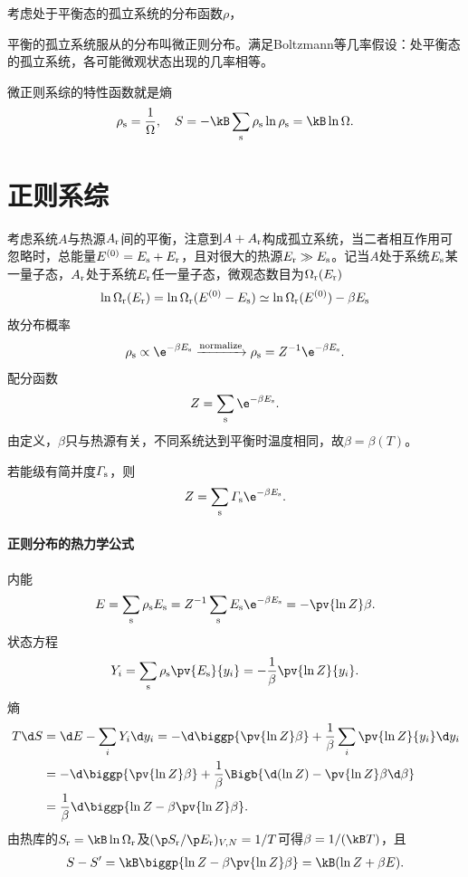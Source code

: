 考虑处于平衡态的孤立系统的分布函数$\rho$，

平衡的孤立系统服从的分布叫微正则分布。满足Boltzmann等几率假设：处平衡态的孤立系统，各可能微观状态出现的几率相等。

微正则系综的特性函数就是熵
\[
	\rho_\st=\frac1\Omega,\quad S=-\kB\sum_\st\rho_\st\ln\rho_\st=\kB\ln\Omega.
\]

\section{正则系综}

考虑系统$A$与热源$A_\mathrm r$间的平衡，注意到$A+A_\mathrm r$构成孤立系统，当二者相互作用可忽略时，总能量$E^{(0)}=E_\mathrm s+E_\mathrm r$，且对很大的热源$E_\mathrm r\gg E_\mathrm s$。记当$A$处于系统$E_\mathrm s$某一量子态，$A_\mathrm r$处于系统$E_\mathrm r$任一量子态，微观态数目为$\Omega_\mathrm r(E_\mathrm r)$
\[
	\ln\Omega_\mathrm r(E_\mathrm r)=\ln\Omega_\mathrm r(E^{(0)}-E_\mathrm s)\simeq\ln\Omega_\mathrm r(E^{(0)})-\beta E_\mathrm s
\]
故分布概率
\[
	\rho_\st\propto\e^{-\beta E_\st}\xrightarrow{\text{normalize}}\rho_\st=Z^{-1}\e^{-\beta E_\st}.
\]
配分函数
\[
	Z=\sum_\st\e^{-\beta E_\st}.
\]
由定义，$\beta$只与热源有关，不同系统达到平衡时温度相同，故$\beta=\beta(T)$。

若能级有简并度$\varGamma_\mathrm s$，则 
\begin{align}
	Z=\sum_\st\varGamma_\st\e^{-\beta E_\st}.
\end{align}
\paragraph{正则分布的热力学公式}内能
\begin{align}
	E=\sum_\st\rho_\st E_\st=Z^{-1}\sum_\st E_\st\e^{-\beta E_\st}=-\pv{\ln Z}\beta.
\end{align}
状态方程
\begin{align}
	Y_i=\sum_\st\rho_\st\pv{E_\st}{y_i}=-\frac1\beta\pv{\ln Z}{y_i}.
\end{align}
熵
\begin{align*}
	T\d S&=\d E-\sum_i Y_i\d y_i=-\d\biggp{\pv{\ln Z}\beta}+\frac1\beta\sum_i\pv{\ln Z}{y_i}\d y_i\\
	&=-\d\biggp{\pv{\ln Z}\beta}+\frac1\beta\Bigb{\d(\ln Z)-\pv{\ln Z}\beta\d\beta}\\
	&=\frac1\beta\d\biggp{\ln Z-\beta\pv{\ln Z}\beta}.
\end{align*}
由热库的$S_\rs=\kB\ln\Omega_\rs$及$(\p S_\rs/\p E_\rs)_{V,N}=1/T$可得$\beta=1/(\kB T)$，且
\begin{align}
	S-S'=\kB\biggp{\ln Z-\beta\pv{\ln Z}\beta}=\kB(\ln Z+\beta E).
\end{align}

